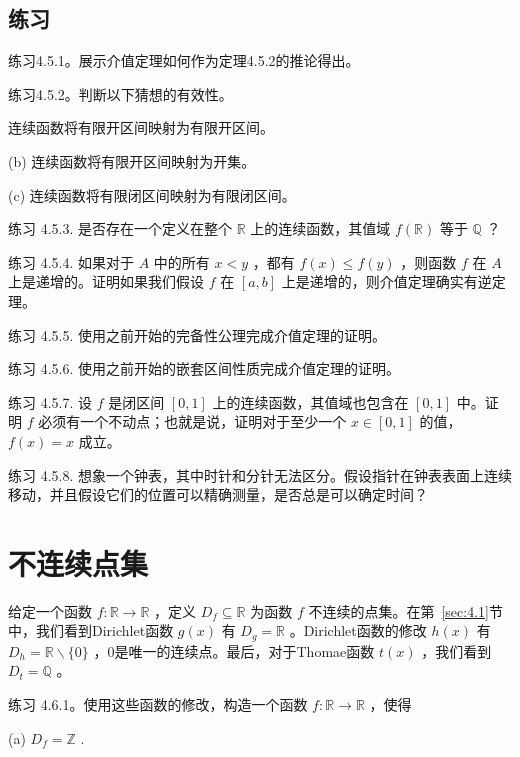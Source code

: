 \subsection{练习}

练习4.5.1。展示介值定理如何作为定理4.5.2的推论得出。

练习4.5.2。判断以下猜想的有效性。

连续函数将有限开区间映射为有限开区间。

(b) 连续函数将有限开区间映射为开集。

(c) 连续函数将有限闭区间映射为有限闭区间。

练习 4.5.3. 是否存在一个定义在整个 \(\mathbb{R}\) 上的连续函数，其值域 \(f\left( \mathbb{R}\right)\) 等于 \(\mathbb{Q}\) ？

练习 4.5.4. 如果对于 \(A\) 中的所有 \(x < y\) ，都有 \(f\left( x\right)  \leq  f\left( y\right)\) ，则函数 \(f\) 在 \(A\) 上是递增的。证明如果我们假设 \(f\) 在 \(\left\lbrack  {a,b}\right\rbrack\) 上是递增的，则介值定理确实有逆定理。

练习 4.5.5. 使用之前开始的完备性公理完成介值定理的证明。

练习 4.5.6. 使用之前开始的嵌套区间性质完成介值定理的证明。

练习 4.5.7. 设 \(f\) 是闭区间 \(\left\lbrack  {0,1}\right\rbrack\) 上的连续函数，其值域也包含在 \(\left\lbrack  {0,1}\right\rbrack\) 中。证明 \(f\) 必须有一个不动点；也就是说，证明对于至少一个 \(x \in  \left\lbrack  {0,1}\right\rbrack\) 的值， \(f\left( x\right)  = x\) 成立。

练习 4.5.8. 想象一个钟表，其中时针和分针无法区分。假设指针在钟表表面上连续移动，并且假设它们的位置可以精确测量，是否总是可以确定时间？

\section{不连续点集}
\label{sec:4.6}
给定一个函数 \(f : \mathbb{R} \rightarrow  \mathbb{R}\) ，定义 \({D}_{f} \subseteq  \mathbb{R}\) 为函数 \(f\) 不连续的点集。在第~\ref{sec:4.1}节中，我们看到Dirichlet函数 \(g\left( x\right)\) 有 \({D}_{g} = \mathbb{R}\) 。Dirichlet函数的修改 \(h\left( x\right)\) 有 \({D}_{h} = \mathbb{R} \smallsetminus  \{ 0\}\) ，$0$是唯一的连续点。最后，对于Thomae函数 \(t\left( x\right)\) ，我们看到 \({D}_{t} = \mathbb{Q}\) 。

练习 4.6.1。使用这些函数的修改，构造一个函数 \(f : \mathbb{R} \rightarrow  \mathbb{R}\) ，使得

(a) \({D}_{f} = \mathbb{Z}\) .

